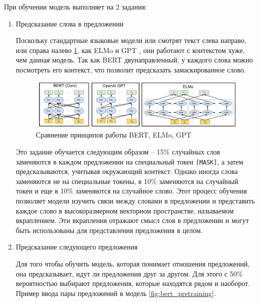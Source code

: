 \documentclass[PI, VKR]{HSEUniversity}
\begin{document}
При обучении модель выполняет на 2 задания:
\begin{enumerate}
\item Предсказание слова в предложении

Поскольку стандартные языковые модели или смотрят текст слева направо, или справа налево \ref{fig:BERT_comparisons}, как ELMo \autocite{elmo} и GPT \autocite{radford2019language}, они работают с контекстом хуже, чем данная модель. Так как BERT двунаправленный, у каждого слова можно посмотреть его контекст, что позволит предсказать замаскированное слово.

\begin{figure}[h]
\centering
\includegraphics[width=.9\linewidth]{img/BERT_comparisons.pdf}
\caption{\label{fig:BERT_comparisons}Сравнение принципов работы BERT, ELMo, GPT}
\end{figure}

Это задание обучается следующим образом -- 15\% случайных слов заменяются в каждом предложении на специальный токен \texttt{[MASK]}, а затем предсказываются, учитывая окружающий контекст. Однако иногда слова заменяются не на специальные токены, в 10\% заменяются на случайный токен и еще в 10\% заменяются на случайное слово. Этот процесс обучения позволяет модели изучить связи между словами в предложении и представить каждое слово в высокоразмерном векторном пространстве, называемом вкраплением. Эти вкрапления отражают смысл слов в предложении и могут быть использованы для представления предложения в целом.

\item Предсказание следующего предложения

Для того чтобы обучить модель, которая понимает отношения предложений, она предсказывает, идут ли предложения друг за другом. Для этого с 50\% вероятностью выбирают предложения, которые находятся рядом и наоборот. Пример ввода пары предложений в модель \ref{fig:bert_pretraining}.


\end{enumerate}
\end{document}

